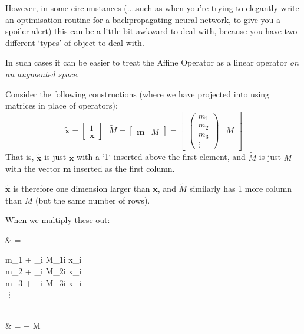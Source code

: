 \documentclass[a4paper,openany,11pt]{book}
\renewcommand\vec[1]{\boldsymbol{\mathbf{#1}}}
\begin{document}
						However, in some circumstances (....such as when you're trying to elegantly write an optimisation routine for a backpropagating neural network, to give you a spoiler alert) this can be a little bit awkward to deal with, because you have two different `types' of object to deal with. 

						In such cases it can be easier to treat the Affine Operator as a linear operator \textit{on an augmented space}. 

						Consider the following constructions (where we have projected into using matrices in place of operators):
						\begin{equation}
							\tilde{\vec{x}} = \begin{bmatrix}
								1 \\ \vec{x} 
							\end{bmatrix} ~~~ \tilde{M} = \begin{bmatrix}
								\vec{m} & M \end{bmatrix} = \begin{bmatrix}
									\begin{pmatrix}
										m_1 \\ m_2 \\ m_3 \\ \vdots
									\end{pmatrix} & M
								\end{bmatrix}
						\end{equation}
						That is, $\tilde{\vec{x}}$ is just $\vec{x}$ with a `1` inserted above the first element, and $\tilde{M}$ is just $M$ with the vector $\vec{m}$ inserted as the first column. 

						$\tilde{\vec{x}}$ is therefore one dimension larger than $\vec{x}$, and $\tilde{M}$ similarly has 1 more column than $M$ (but the same number of rows).

						When we multiply these out:
						\begin{spalign}
							 \tilde{\vec{x}} & = \begin{pmatrix}
								m_1 + \sum_{i} M_{1i} x_i
								\\
								m_2 + \sum_i M_{2i} x_i
								\\
								m_3 + \sum_i M_{3i} x_i
								\\
								\vdots 
							\end{pmatrix}
							\\
							& = \vec{m} + M\vec{x}
						\end{spalign}
\end{document}
